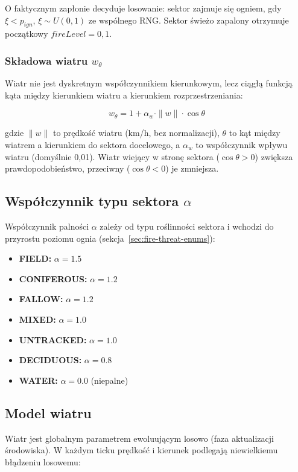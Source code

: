 \documentclass[11pt,a4paper]{article}
\begin{document}
O faktycznym zapłonie decyduje losowanie: sektor zajmuje się ogniem, gdy $\xi < p_{ign}$, $\xi \sim U(0,1)$ ze wspólnego RNG. Sektor świeżo zapalony otrzymuje początkowy $fireLevel = 0{,}1$.

\subsubsection*{Składowa wiatru $w_{\theta}$}

Wiatr nie jest dyskretnym współczynnikiem kierunkowym, lecz ciągłą funkcją kąta między kierunkiem wiatru a kierunkiem rozprzestrzeniania:

\begin{equation}
w_{\theta} = 1 + \alpha_{w} \cdot \|w\| \cdot \cos\theta
\end{equation}

gdzie $\|w\|$ to prędkość wiatru (km/h, bez normalizacji), $\theta$ to kąt między wiatrem a kierunkiem do sektora docelowego, a $\alpha_{w}$ to współczynnik wpływu wiatru (domyślnie 0,01). Wiatr wiejący w stronę sektora ($\cos\theta > 0$) zwiększa prawdopodobieństwo, przeciwny ($\cos\theta < 0$) je zmniejsza.

\subsection{Współczynnik typu sektora $\alpha$}
\label{sec:alpha}

Współczynnik palności $\alpha$ zależy od typu roślinności sektora i wchodzi do przyrostu poziomu ognia (sekcja~\ref{sec:fire-threat-enums}):
\begin{itemize}
    \item \textbf{FIELD:} $\alpha = 1.5$
    \item \textbf{CONIFEROUS:} $\alpha = 1.2$
    \item \textbf{FALLOW:} $\alpha = 1.2$
    \item \textbf{MIXED:} $\alpha = 1.0$
    \item \textbf{UNTRACKED:} $\alpha = 1.0$
    \item \textbf{DECIDUOUS:} $\alpha = 0.8$
    \item \textbf{WATER:} $\alpha = 0.0$ (niepalne)
\end{itemize}

\subsection{Model wiatru}

Wiatr jest globalnym parametrem ewoluującym losowo (faza aktualizacji środowiska). W każdym ticku prędkość i kierunek podlegają niewielkiemu błądzeniu losowemu:
\end{document}
